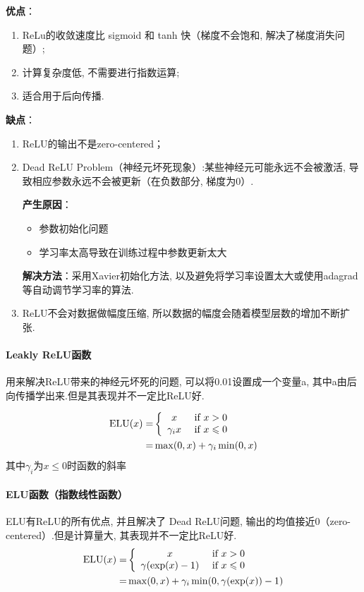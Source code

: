 \textbf{优点}：
\begin{enumerate}
    \renewcommand{\labelenumi}{(\theenumi)}
    \item   ReLu的收敛速度比 sigmoid 和 tanh 快（梯度不会饱和, 解决了梯度消失问题）;
     \item  计算复杂度低, 不需要进行指数运算;
     \item 适合用于后向传播.
\end{enumerate}

\textbf{缺点}：
\begin{enumerate} 
    \renewcommand{\labelenumi}{(\theenumi)}
\item  ReLU的输出不是zero-centered； 
\item  Dead ReLU Problem（神经元坏死现象）:某些神经元可能永远不会被激活, 导致相应参数永远不会被更新（在负数部分, 梯度为0）.

\textbf{产生原因}：
\begin{itemize}
    \item 参数初始化问题
    \item 学习率太高导致在训练过程中参数更新太大
\end{itemize}
 \textbf{解决方法}：采用Xavier初始化方法, 以及避免将学习率设置太大或使用adagrad等自动调节学习率的算法.
\item ReLU不会对数据做幅度压缩, 所以数据的幅度会随着模型层数的增加不断扩张.
\end{enumerate}
\paragraph{Leakly  ReLU函数}
用来解决ReLU带来的神经元坏死的问题, 可以将0.01设置成一个变量a, 其中a由后向传播学出来.但是其表现并不一定比ReLU好.

\begin{align*}
\mathrm{ELU}(x)=&
\left\{ 
\begin{array}{c c}    
    x  \ & \text{if} \  x>0 \\    
    \gamma_i x \ & \text{if} \ x \leqslant 0  \\   
\end{array} 
\right. \\
=& \max(0, x)+\gamma_i \min(0, x)
\end{align*}
其中$\gamma_i$为$x \leqslant 0 $时函数的斜率

\paragraph{ELU函数（指数线性函数）}
ELU有ReLU的所有优点, 并且解决了 Dead ReLU问题, 输出的均值接近0（zero-centered）.但是计算量大, 其表现并不一定比ReLU好.
\begin{align*}
    \mathrm{ELU}(x)= &
    \left\{ 
    \begin{array}{c c}    
        x  \ & \text{if} \  x>0 \\    
        \gamma(\exp(x)-1) \ & \text{if} \ x \leqslant 0  \\   
    \end{array} 
    \right. \\
    = & \max(0, x)+\gamma_i \min(0, \gamma(\exp(x))-1)
    \end{align*}
      

